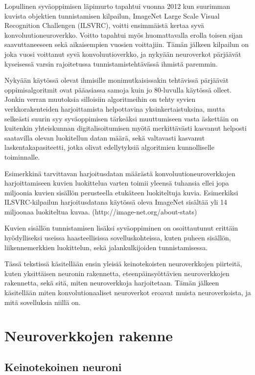 \documentclass[finnish]{tktltiki2}
\theoremstyle{definition}
\theoremstyle{remark}
\begin{document}
  Lopullinen syväoppimisen läpimurto tapahtui vuonna 2012 kun suurimman kuvista objektien tunnistamisen kilpailun, ImageNet Large Scale Visual Recognition Challengen (ILSVRC), voitti ensimmäistä kertaa syvä konvoluutioneuroverkko. Voitto tapahtui myös huomattavalla erolla toisen sijan saavuttaneeseen sekä aikaisempien vuosien voittajiin. Tämän jälkeen kilpailun on joka vuosi voittanut syvä konvoluutioverkko, ja nykyään neuroverkot pärjäävät kyseisessä varsin rajoitetussa tunnistamistehtävässä ihmistä paremmin.

  Nykyään käytössä olevat ihmisille monimutkaisissakin tehtävissä pärjäävät oppimisalgoritmit ovat pääasiassa samoja kuin jo 80-luvulla käytössä olleet. Jonkin verran muutoksia silloisiin algoritmeihin on tehty syvien verkkorakenteiden harjoittamista helpottavina yksinkertaistuksina, mutta selkeästi suurin syy syväoppimisen tärkeäksi muuttumiseen vasta äskettäin on kuitenkin yhteiskunnan digitalisoitumisen myötä merkittävästi kasvanut helposti saatavilla olevan luokitellun datan määrä, sekä valtavasti kasvanut laskentakapasiteetti, jotka olivat edellytyksiä algoritmien kunnolliselle toiminnalle.

  Esimerkkinä tarvittavan harjoitusdatan määrästä konvoluutioneuroverkkojen harjoittamiseen kuvien luokittelua varten toimii yleensä tuhansia ellei jopa miljoonia kuvien sisällön perusteella etukäteen luokiteltuja kuvia. Esimerkiksi ILSVRC-kilpailun harjoitusdatana käytössä oleva ImageNet sisältää yli 14 miljoonaa luokiteltua kuvaa. (http://image-net.org/about-stats)

  Kuvien sisällön tunnistamisen lisäksi syväoppiminen on osoittautunut erittäin hyödylliseksi useissa haasteellisissa sovelluskohteissa, kuten puheen sisällön, liikennemerkkien luokittelun, sekä jalankulkijoiden tunnistamisessa.

  Tässä tekstissä käsitellään ensin yleisiä keinotekoisten neuroverkkojen piirteitä, kuten yksittäisen neuronin rakennetta, eteenpäinsyöttävien neuroverkkojen rakennetta, sekä sitä, miten neuroverkkoja harjoitetaan. Tämän jälkeen käsitellään miten konvolutionaaliset neuroverkot eroavat muista neuroverkoista, ja mitä sovelluksia niillä on.

  \section{Neuroverkkojen rakenne}
  \subsection{Keinotekoinen neuroni}
\end{document}
